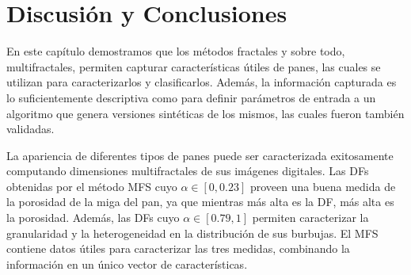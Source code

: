 






\section{Discusión y Conclusiones}

En este capítulo demostramos que los métodos fractales y sobre todo, multifractales, permiten capturar características útiles de panes, las cuales se utilizan para caracterizarlos y clasificarlos.
Además, la información capturada es lo suficientemente descriptiva como para definir parámetros de entrada a un algoritmo que genera versiones sintéticas de los mismos, las cuales fueron también validadas.


La apariencia de diferentes tipos de panes puede ser caracterizada exitosamente computando dimensiones multifractales de sus imágenes digitales.
Las DFs obtenidas por el método MFS cuyo $\alpha \in [0,0.23]$ proveen una buena medida de la porosidad de la miga del pan, ya que mientras más alta es la DF, más alta es la porosidad.
Además, las DFs cuyo $\alpha \in [0.79,1]$ permiten caracterizar la granularidad y la heterogeneidad en la distribución de sus burbujas.
El MFS contiene datos útiles para caracterizar las tres medidas, combinando la información en un único vector de características.

